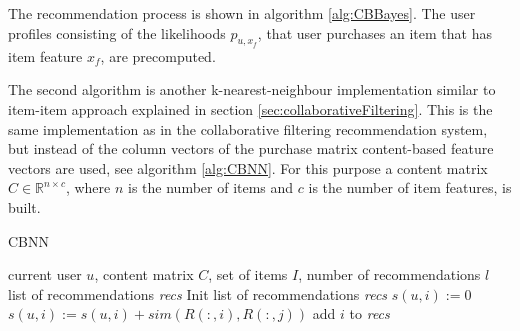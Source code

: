 \documentclass[10pt]{reportMaster}
\begin{document}
The recommendation process is shown in algorithm \ref{alg:CBBayes}.
The user profiles consisting of the likelihoods $p_{u, x_f}$, that user purchases an item that has item feature $x_f$, are precomputed.

The second algorithm is another k-nearest-neighbour implementation similar to item-item approach explained in section \ref{sec:collaborativeFiltering}.
This is the same implementation as in the collaborative filtering recommendation system, but instead of the column vectors of the purchase matrix content-based feature vectors are used, see algorithm \ref{alg:CBNN}.
For this purpose a content matrix $C \in \mathds{R}^{n \times c}$, where $n$ is the number of items and $c$ is the number of item features, is built.


\begin{algorithm}
	\caption{CBNN}
	\label{alg:CBNN}
	\begin{algorithmic}[1]
		\Require current user $u$, content matrix $C$, set of items $I$, number of recommendations $l$
		\Ensure list of recommendations \textit{recs}
		\State Init list of recommendations \textit{recs}
			\State $s(u,i) := 0$
				\State $s(u,i) := s(u,i) + sim(R(:,i), R(:,j))$
			\EndFor
				\State add $i$ to \textit{recs}
			\EndIf
		\EndFor
	\end{algorithmic}	
\end{algorithm}

 
%
%

\end{document}
